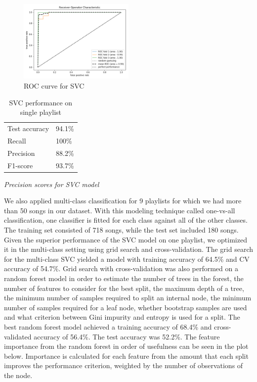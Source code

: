 \documentclass[acmtog]{acmart}
\begin{document}
\begin{figure}[h]
  \includegraphics[width=0.5\textwidth]{ROC_curve}
  \caption{ROC curve for SVC}
  \label{fig:ROC_curve}
\end{figure}

\newpage
\begin{table}%
\caption{SVC performance on single playlist}
\label{tab:one}
\begin{minipage}{\columnwidth}
\begin{center}
\begin{tabular}{ll}
  \toprule
  Test accuracy    & 94.1\%\\
  Recall  & 100\%\\
  Precision    & 88.2\%\\
  F1-score    & 93.7\%\\
  \bottomrule
\end{tabular}
\end{center}
\bigskip\centering
\footnotesize
 \emph{Precision scores for SVC model}
\end{minipage}
\end{table}%
\newpage
We also applied multi-class classification for 9 playlists for which we had more than 50 songs in our dataset. With this modeling technique called one-vs-all classification, one classifier is fitted for each class against all of the other classes. The training set consisted of 718 songs, while the test set included 180 songs. Given the superior performance of the SVC model on one playlist, we optimized it in the multi-class setting using grid search and cross-validation. The grid search for the multi-class SVC yielded a model with training accuracy of 64.5\% and CV accuracy of 54.7\%. Grid search with cross-validation was also performed on a random forest model in order to estimate the number of trees in the forest, the number of features to consider for the best split, the maximum depth of a tree, the minimum number of samples required to split an internal node, the minimum number of samples required for a leaf node, whether bootstrap samples are used and what criterion between Gini impurity and entropy is used for a split. The best random forest model achieved a training accuracy of 68.4\% and cross-validated accuracy of 56.4\%. The test accuracy was 52.2\%. The feature importance from the random forest in order of usefulness can be seen in the plot below. Importance is calculated for each feature from the amount that each split improves the performance criterion, weighted by the number of observations of the node.
\end{document}
